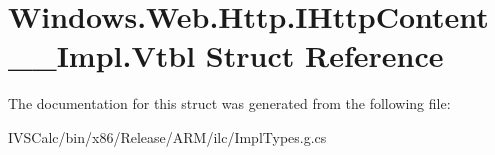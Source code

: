 \hypertarget{struct_windows_1_1_web_1_1_http_1_1_i_http_content_____impl_1_1_vtbl}{}\section{Windows.\+Web.\+Http.\+I\+Http\+Content\+\_\+\+\_\+\+Impl.\+Vtbl Struct Reference}
\label{struct_windows_1_1_web_1_1_http_1_1_i_http_content_____impl_1_1_vtbl}


The documentation for this struct was generated from the following file\+:\begin{DoxyCompactItemize}
\item 
I\+V\+S\+Calc/bin/x86/\+Release/\+A\+R\+M/ilc/Impl\+Types.\+g.\+cs\end{DoxyCompactItemize}
